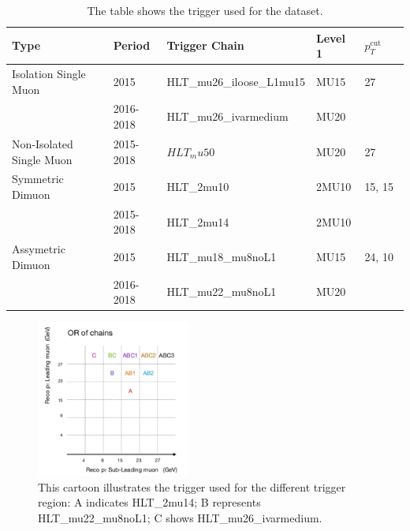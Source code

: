 \begin{table}[!htb]
    \begin{center}
    \caption{
        The table shows the trigger used for the dataset.
    }
\label{tab:Data Trigger}
\begin{tabular}{|l|l|l|l|l}
\hline
\textbf{Type}   & \textbf{Period}                                                         &\textbf{Trigger Chain} &\textbf{Level 1} &\textbf{$p_{T}^{\textrm{cut offline}}$}\\ \hline
Isolation Single Muon   & 2015 & HLT\_mu26\_iloose\_L1mu15 & MU15 & 27 \\ 
                        & 2016-2018  & HLT\_mu26\_ivarmedium    & MU20 & \\ \hline
Non-Isolated Single Muon & 2015-2018                                       &$HLT_mu50$& MU20& 27 \\ \hline
Symmetric Dimuon & 2015 & HLT\_2mu10 & 2MU10 & 15, 15 \\
                 & 2015-2018 & HLT\_2mu14 & 2MU10 & \\ \hline
Assymetric Dimuon & 2015 & HLT\_mu18\_mu8noL1 & MU15 & 24, 10 \\
                  & 2016-2018 & HLT\_mu22\_mu8noL1 & MU20 \\ \hline
\end{tabular}
\end{center}
\end{table}

\begin{figure}[!htb]
    \begin{center}
        \includegraphics[width=0.45\textwidth]{figures/chapter_dimuon/TriggerChain}        
        \caption{
        This cartoon illustrates the trigger used for the different trigger region: A indicates HLT\_2mu14; B represents HLT\_mu22\_mu8noL1; C shows HLT\_mu26\_ivarmedium. }
    \end{center}
\end{figure}
\FloatBarrier

